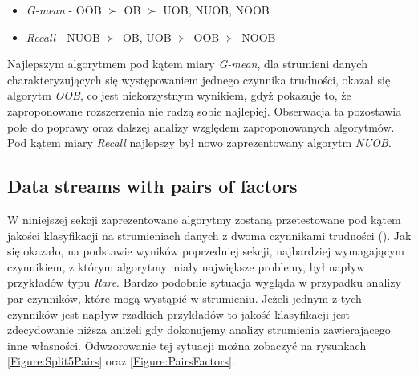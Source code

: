 \begin{itemize}
    \item \textit{G-mean} - OOB $\succ$ OB $\succ$ UOB, NUOB, NOOB
    \item \textit{Recall} - NUOB $\succ$ OB, UOB $\succ$ OOB $\succ$ NOOB
\end{itemize}

\noindent Najlepszym algorytmem pod kątem miary \textit{G-mean}, dla strumieni danych charakteryzujących się występowaniem jednego czynnika trudności, okazał się algorytm \textit{OOB}, co jest niekorzystnym wynikiem, gdyż pokazuje to, że zaproponowane rozszerzenia nie radzą sobie najlepiej. Obserwacja ta pozostawia pole do poprawy oraz dalszej analizy względem zaproponowanych algorytmów. Pod kątem miary \textit{Recall} najlepszy był nowo zaprezentowany algorytm \textit{NUOB}.

\subsection{Data streams with pairs of factors}

\noindent W niniejszej sekcji zaprezentowane algorytmy zostaną przetestowane pod kątem jakości klasyfikacji na strumieniach danych z dwoma czynnikami trudności (). Jak się okazało, na podstawie wyników poprzedniej sekcji, najbardziej wymagającym czynnikiem, z którym algorytmy miały największe problemy, był napływ przykładów typu \textit{Rare}. Bardzo podobnie sytuacja wygląda w przypadku analizy par czynników, które mogą wystąpić w strumieniu. Jeżeli jednym z tych czynników jest napływ rzadkich przykładów to jakość klasyfikacji jest zdecydowanie niższa aniżeli gdy dokonujemy analizy strumienia zawierającego inne własności. Odwzorowanie tej sytuacji można zobaczyć na rysunkach \ref{Figure:Split5Pairs} oraz \ref{Figure:PairsFactors}.


